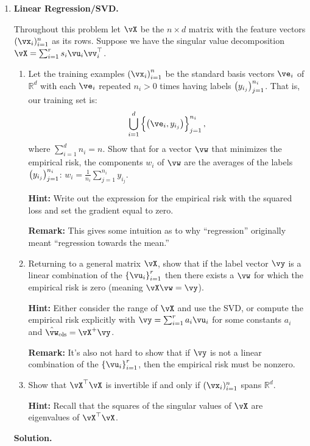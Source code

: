 \documentclass{article}
\def\R{\mathbb{R}}
\theoremstyle{definition}
\theoremstyle{remark}
\newenvironment{Q}
{%
  \clearpage
  \item
  }
  {%
    \phantom{s} %
    \bigskip
    \textbf{Solution.}
  }
\begin{document}
  \begin{enumerate}[font={\Large\bfseries},left=0pt]
    \begin{Q}
  \textbf{\Large Linear Regression/SVD.}

  Throughout this problem let $\vX$ be the $n \times d$ matrix with the feature vectors $(\vx_i)_{i = 1}^n$ as its rows. Suppose we have the singular value decomposition $\vX = \sum_{i = 1}^r s_i \vu_i \vv_i^\top$.
  \begin{enumerate}
    \item Let the training examples $\del{\vx_i}_{i = 1}^n$ be the standard basis vectors $\ve_i$ of $\R^d$ with each $\ve_i$ repeated $n_i > 0$ times having labels $\del{y_{i_j}}_{j = 1}^{n_i}$. That is, our training set is:
    \[
        \bigcup_{i = 1}^d \cbr{\del{\ve_i, y_{i_j}}}_{j = 1}^{n_i},
    \]
    where $\sum_{i = 1}^d n_i = n$. Show that for a vector $\vw$ that minimizes the empirical risk, the components $w_i$ of $\vw$ are the averages of the labels $\del{y_{i_j}}_{j = 1}^{n_i}$: $w_i = \frac{1}{n_i}\sum_{j = 1}^{n_i} y_{i_j}$.
    
    \textbf{Hint:} Write out the expression for the empirical risk with the squared loss and set the gradient equal to zero.
    
    \textbf{Remark:} This gives some intuition as to why ``regression'' originally meant ``regression towards the mean.''
    
    \item Returning to a general matrix $\vX$, show that if the label vector $\vy$ is a linear combination of the $\cbr{\vu_i}_{i = 1}^r$ then there exists a $\vw$ for which the empirical risk is zero (meaning $\vX \vw = \vy$).
    
    \textbf{Hint:} Either consider the range of $\vX$ and use the SVD, or compute the empirical risk explicitly with $\vy = \sum_{i = 1}^r a_i \vu_i$ for some constants $a_i$ and $\hat{\vw}_{\textrm{ols}} = \vX^+ \vy$.
    
    \textbf{Remark:} It's also not hard to show that if $\vy$ is not a linear combination of the $\cbr{\vu_i}_{i = 1}^r$, then the empirical risk must be nonzero.
    
    \item Show that $\vX^\top \vX$ is invertible if and only if $(\vx_i)_{i = 1}^n$ spans $\mathbb{R}^d$.
    
    \textbf{Hint:} Recall that the squares of the singular values of $\vX$ are eigenvalues of $\vX^\top \vX$.


\end{enumerate}
\end{Q}
\end{enumerate}
\end{document}
